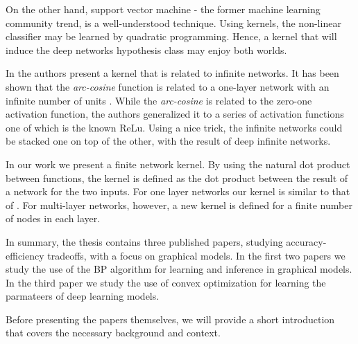  
On the other hand, support vector machine - the former machine learning community trend, is a well-understood technique.
Using kernels, the non-linear classifier may be learned by quadratic programming\cite{scholkopf2002learning}.
Hence, a kernel that will induce the deep networks hypothesis class may enjoy both worlds.

In \cite{cho2009kernel} the authors present a kernel that is related to infinite networks.
It has been shown that the \textit{arc-cosine} function is related to a one-layer network with an infinite number of units \cite{williams1998computation}.
While the \textit{arc-cosine} is related to the zero-one activation function, the authors generalized it to a series of activation functions one of which is the known ReLu.
Using a nice trick, the infinite networks could be stacked one on top of the other, with the result of deep infinite networks.

In our work \cite{heinemann2016improper} we present a finite network kernel.
By using the natural dot product between functions, the kernel is defined as the dot product between the result of a network for the two inputs.
For one layer networks our kernel is similar to that of \cite{cho2009kernel}.
For multi-layer networks, however, a new kernel is defined for a finite number of nodes in each layer.

In summary, the thesis contains three published papers, studying accuracy-efficiency tradeoffs, with a focus on graphical models. In the first two papers we study the use of the BP algorithm for learning and inference in graphical models. In the third paper we study the use of convex optimization for learning the parmateers of deep learning models. 

Before presenting the papers themselves, we will provide a short introduction that covers the necessary background and context.
 

